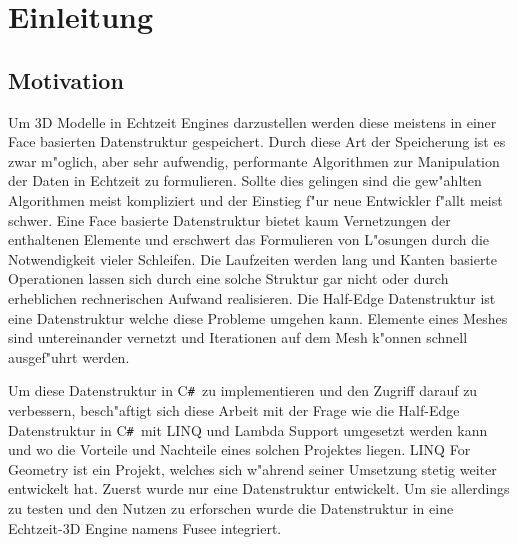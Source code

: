 \documentclass[pagesize, paper=a4, fontsize=12pt,titlepage=true, headings=small, headnosepline, abstractoff, liststotoc, nochapterprefix, plainheadsepline]{scrreprt}
\newcommand{\CSS}{C\texttt{\# }}
\newcommand{\LFGS}{LINQ For Geometry }
\newcommand{\HES}{Half-Edge Datenstruktur }
\begin{document}







\chapter {Einleitung}
	\section {Motivation}
Um 3D Modelle in Echtzeit Engines darzustellen werden diese meistens in einer Face basierten Datenstruktur gespeichert. Durch diese Art der Speicherung ist es zwar m"oglich, aber sehr aufwendig, performante Algorithmen zur Manipulation der Daten in Echtzeit zu formulieren. Sollte dies gelingen sind die gew"ahlten Algorithmen meist kompliziert und der Einstieg f"ur neue Entwickler f"allt meist schwer. Eine Face basierte Datenstruktur bietet kaum Vernetzungen der enthaltenen Elemente und erschwert das Formulieren von L"osungen durch die Notwendigkeit vieler Schleifen. Die Laufzeiten werden lang und Kanten basierte Operationen lassen sich durch eine solche Struktur gar nicht oder durch erheblichen rechnerischen Aufwand realisieren. Die \HES ist eine Datenstruktur welche diese Probleme umgehen kann. Elemente eines Meshes sind untereinander vernetzt und Iterationen auf dem Mesh k"onnen schnell ausgef"uhrt werden.
\newline

Um diese Datenstruktur in \CSS zu implementieren und den Zugriff darauf zu verbessern, besch"aftigt sich diese Arbeit mit der Frage wie die \HES in \CSS mit LINQ und Lambda Support umgesetzt werden kann und wo die Vorteile und Nachteile eines solchen Projektes liegen. \LFGS ist ein Projekt, welches sich w"ahrend seiner Umsetzung stetig weiter entwickelt hat. Zuerst wurde nur eine Datenstruktur entwickelt. Um sie allerdings zu testen und den Nutzen zu erforschen wurde die Datenstruktur in eine Echtzeit-3D Engine namens Fusee integriert.
\newline
\end{document}
